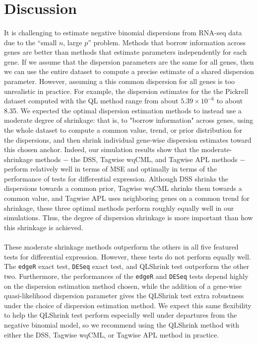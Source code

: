 \documentclass[10pt]{article}
\begin{document}
\section*{Discussion}

\paragraph{} \indent It is challenging to estimate negative binomial dispersions from RNA-seq data due to the ``small $n$, large $p$'' problem. Methods that borrow information across genes are better than methods that estimate parameters independently for each gene. If we assume that the dispersion parameters are the same for all genes, then we can use the entire dataset to compute a precise estimate of a shared dispersion parameter. However, assuming a this common dispersion for all genes is too unrealistic in practice. For example, the dispersion estimates for the the Pickrell dataset computed with the QL method range from about $5.39 \times 10^{-6}$ to about 8.35. We expected the optimal dispersion estimation methods to instead use a moderate degree of shrinkage: that is, to "borrow information" across genes, using the whole dataset to compute a common value, trend, or prior distribution for the dispersions, and then shrink individual gene-wise dispersion estimates toward this chosen anchor. Indeed, our simulation results show that the moderate-shrinkage methods $-$ the DSS, Tagwise wqCML, and Tagwise APL methods $-$ perform relatively well in terms of MSE and optimally in terms of the performance of tests for differential expression. Although DSS shrinks the dispersions towards a common prior, Tagwise wqCML shrinks them towards a common value, and Tagwise APL uses neighboring genes on a common trend for shrinkage, these three optimal methods perform roughly equally well in our simulations. Thus, the degree of dispersion shrinkage is more important than how this shrinkage is achieved.

\paragraph{} \indent These moderate shrinkage methods outperform the others in all five featured tests for differential expression. However, these tests do not perform equally well. The {\tt edgeR} exact test, {\tt DESeq} exact test, and QLShrink test outperform the other two. Furthermore, the performances of the {\tt edgeR} and {\tt DESeq} tests depend highly on the dispersion estimation method chosen, while the addition of a gene-wise quasi-likelihood dispersion parameter gives the QLShrink test extra robustness under the choice of dispersion estimation method. We expect this same flexibility to help the QLShrink test perform especially well under departures from the negative binomial model, so we recommend using the QLShrink method with either the DSS, Tagwise wqCML, or Tagwise APL method in practice.
\end{document}
